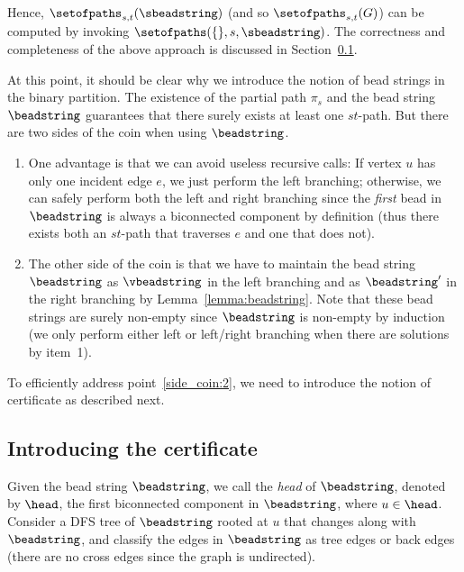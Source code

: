 \noindent
Hence, $\setofpaths_{s,t}(\sbeadstring)$ (and so
$\setofpaths_{s,t}(G)$) can be computed by invoking $\setofpaths(\{\}, s,
\sbeadstring)$. The correctness and completeness of the above approach
is discussed in Section~\ref{sec:intro-cert}.

At this point, it should be clear why we introduce the notion of bead
strings in the binary partition. The existence of the partial path
$\pi_s$ and the bead string $\beadstring$ guarantees that there surely
exists at least one $st$-path. But there are two sides of the coin
when using $\beadstring$.

\begin{enumerate}
\item One advantage is that we can avoid useless recursive calls:
If vertex $u$ has only one incident edge $e$, we just perform the left
branching; otherwise, we can safely perform both the left and right
branching since the \emph{first} bead in $\beadstring$ is always a
biconnected component by definition (thus there exists both an
$st$-path that traverses $e$ and one that does not).

\item \label{side_coin:2} The other side of the coin is that we have to maintain the
bead string $\beadstring$ as $\vbeadstring$ in the left branching and
as $\beadstring'$ in the right branching by
Lemma~\ref{lemma:beadstring}. Note that these bead strings are surely
non-empty since $\beadstring$ is non-empty by induction (we only
perform either left or left/right branching when there are solutions by
item~1).
\end{enumerate}

To efficiently address point~\ref{side_coin:2}, we need to introduce the notion of
certificate as described next. 


\subsection{Introducing the certificate}
\label{sec:intro-cert}

Given the bead string $\beadstring$, we call the \emph{head} of
$\beadstring$, denoted by $\head$, the first biconnected component in
$\beadstring$, where $u \in \head$. Consider a DFS tree of
$\beadstring$ rooted at $u$ that changes along with $\beadstring$, and
classify the edges in $\beadstring$ as tree edges or back edges (there
are no cross edges since the graph is undirected).

